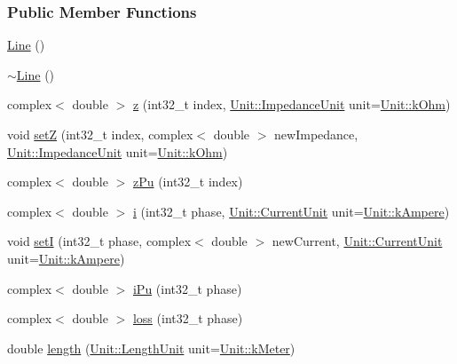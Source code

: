 \subsubsection*{Public Member Functions}
\begin{DoxyCompactItemize}
\item 
\hyperlink{group___models_gacc11b8a429d8cdd63ba6803dff5602b3}{Line} ()
\item 
\hyperlink{group___models_gaabe85f48d22d92b62257091f48174fac}{$\sim$\+Line} ()
\item 
complex$<$ double $>$ \hyperlink{group___models_gab5370574fd93e13eb11742f7753fe1f1}{z} (int32\+\_\+t index, \hyperlink{class_unit_a3747e779c805df24a71961290be3fbdf}{Unit\+::\+Impedance\+Unit} unit=\hyperlink{class_unit_a3747e779c805df24a71961290be3fbdfa6b9c74d1763eefbaf751eeecff0bd9da}{Unit\+::k\+Ohm})
\item 
void \hyperlink{group___models_ga409df7d11f5c5d594a13fb2f74b3b9e0}{set\+Z} (int32\+\_\+t index, complex$<$ double $>$ new\+Impedance, \hyperlink{class_unit_a3747e779c805df24a71961290be3fbdf}{Unit\+::\+Impedance\+Unit} unit=\hyperlink{class_unit_a3747e779c805df24a71961290be3fbdfa6b9c74d1763eefbaf751eeecff0bd9da}{Unit\+::k\+Ohm})
\item 
complex$<$ double $>$ \hyperlink{group___models_ga139698332327a712f6c02d96fe73fbee}{z\+Pu} (int32\+\_\+t index)
\item 
complex$<$ double $>$ \hyperlink{group___models_gaf81e7055102816465bdf7e19afc2d547}{i} (int32\+\_\+t phase, \hyperlink{class_unit_a0794cf6c9682f48296dd4a5315389787}{Unit\+::\+Current\+Unit} unit=\hyperlink{class_unit_a0794cf6c9682f48296dd4a5315389787a368a3c470f0b590a6100dda717a7dd4f}{Unit\+::k\+Ampere})
\item 
void \hyperlink{group___models_ga9e55b06dc3e385838fdd13d5580438ef}{set\+I} (int32\+\_\+t phase, complex$<$ double $>$ new\+Current, \hyperlink{class_unit_a0794cf6c9682f48296dd4a5315389787}{Unit\+::\+Current\+Unit} unit=\hyperlink{class_unit_a0794cf6c9682f48296dd4a5315389787a368a3c470f0b590a6100dda717a7dd4f}{Unit\+::k\+Ampere})
\item 
complex$<$ double $>$ \hyperlink{group___models_ga8f71e477800134586652d283087ed373}{i\+Pu} (int32\+\_\+t phase)
\item 
complex$<$ double $>$ \hyperlink{group___models_ga84ddf17bee846a6f21c44d463252dd25}{loss} (int32\+\_\+t phase)
\item 
double \hyperlink{group___models_gae2e4500d0fa60dcc2ecb08b2c96954f9}{length} (\hyperlink{class_unit_a8c8921f7b225ad6063b1cb573425b9a0}{Unit\+::\+Length\+Unit} unit=\hyperlink{class_unit_a8c8921f7b225ad6063b1cb573425b9a0abfa41ebe7ee649a1f02c9b8ae570434b}{Unit\+::k\+Meter})

\end{DoxyCompactItemize}
